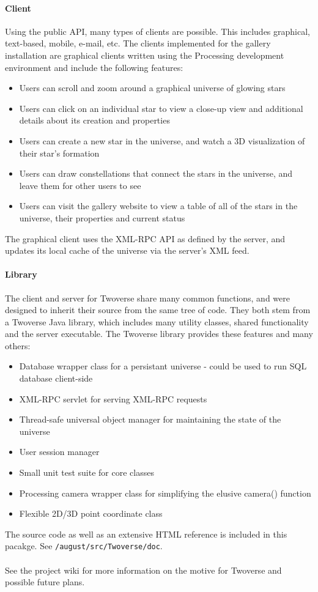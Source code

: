 \paragraph{Client}
Using the public API, many types of clients are possible. This includes graphical, text-based, mobile, e-mail, etc. The clients implemented for the gallery installation are graphical clients written using the Processing development environment and include the following features:
\begin{itemize}
\item Users can scroll and zoom around a graphical universe of glowing stars
\item Users can click on an individual star to view a close-up view and additional details about its creation and properties
\item Users can create a new star in the universe, and watch a 3D visualization of their star's formation
\item Users can draw constellations that connect the stars in the universe, and leave them for other users to see
\item Users can visit the gallery website to view a table of all of the stars in the universe, their properties and current status
\end{itemize}
The graphical client uses the XML-RPC API as defined by the server, and updates its local cache of the universe via the server's XML feed.

\paragraph{Library}
The client and server for Twoverse share many common functions, and were designed to inherit their source from the same tree of code. They both stem from a Twoverse Java library, which includes many utility classes, shared functionality and the server executable. The Twoverse library provides these features and many others:
\begin{itemize}
\item Database wrapper class for a persistant universe - could be used to run SQL database client-side
\item XML-RPC servlet for serving XML-RPC requests
\item Thread-safe universal object manager for maintaining the state of the universe
\item User session manager
\item Small unit test suite for core classes
\item Processing camera wrapper class for simplifying the elusive camera() function
\item Flexible 2D/3D point coordinate class
\end{itemize}
The source code as well as an extensive HTML reference is included in this pacakge. See \texttt{/august/src/Twoverse/doc}.

\paragraph{}
See the project wiki \cite{WIKI} for more information on the motive for Twoverse and possible future plans.
